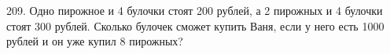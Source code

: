 209. Одно пирожное и 4 булочки стоят 200 рублей, а 2 пирожных и 4 булочки стоят 300 рублей. Сколько булочек сможет купить Ваня, если у него есть 1000 рублей и он уже купил 8 пирожных?\\
